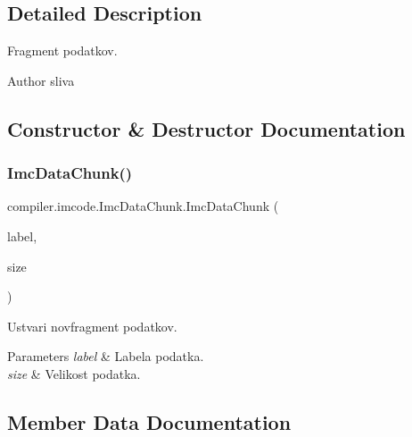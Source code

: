 \subsection{Detailed Description}
Fragment podatkov.

\begin{DoxyAuthor}{Author}
sliva 
\end{DoxyAuthor}


\subsection{Constructor \& Destructor Documentation}
\mbox{\label{classcompiler_1_1imcode_1_1_imc_data_chunk_ad83249693211572b2d0a57ea6967d9a8}} 
\subsubsection{\texorpdfstring{Imc\+Data\+Chunk()}{ImcDataChunk()}}
{\footnotesize\ttfamily compiler.\+imcode.\+Imc\+Data\+Chunk.\+Imc\+Data\+Chunk (\begin{DoxyParamCaption}\item[{\hyperlink{classcompiler_1_1frames_1_1_frm_label}{Frm\+Label}}]{label,  }\item[{int}]{size }\end{DoxyParamCaption})}

Ustvari novfragment podatkov.


\begin{DoxyParams}{Parameters}
{\em label} & Labela podatka. \\
\hline
{\em size} & Velikost podatka. \\
\hline
\end{DoxyParams}


\subsection{Member Data Documentation}
\mbox{\label{classcompiler_1_1imcode_1_1_imc_data_chunk_a06d6b7276c9cfb350235f9095ff5d6a8}} 

